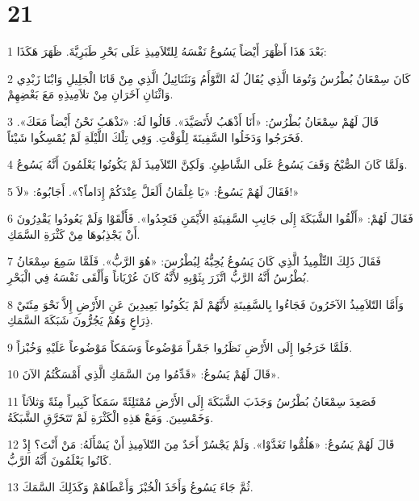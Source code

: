 \chapter{21}

\par 1 بَعْدَ هَذَا أَظْهَرَ أَيْضاً يَسُوعُ نَفْسَهُ لِلتّلاَمِيذِ عَلَى بَحْرِ طَبَرِيَّةَ. ظَهَرَ هَكَذَا:
\par 2 كَانَ سِمْعَانُ بُطْرُسُ وَتُومَا الَّذِي يُقَالُ لَهُ التَّوْأَمُ وَنَثَنَائِيلُ الَّذِي مِنْ قَانَا الْجَلِيلِ وَابْنَا زَبْدِي وَاثْنَانِ آخَرَانِ مِنْ تلاَمِيذِهِ مَعَ بَعْضِهِمْ.
\par 3 قَالَ لَهُمْ سِمْعَانُ بُطْرُسُ: «أَنَا أَذْهَبُ لأَتَصَيَّدَ». قَالُوا لَهُ: «نَذْهَبُ نَحْنُ أَيْضاً مَعَكَ». فَخَرَجُوا وَدَخَلُوا السَّفِينَةَ لِلْوَقْتِ. وَفِي تِلْكَ اللَّيْلَةِ لَمْ يُمْسِكُوا شَيْئاً.
\par 4 وَلَمَّا كَانَ الصُّبْحُ وَقَفَ يَسُوعُ عَلَى الشَّاطِئِ. وَلَكِنَّ التّلاَمِيذَ لَمْ يَكُونُوا يَعْلَمُونَ أَنَّهُ يَسُوعُ.
\par 5 فَقَالَ لَهُمْ يَسُوعُ: «يَا غِلْمَانُ أَلَعَلَّ عِنْدَكُمْ إِدَاماً؟». أَجَابُوهُ: «لاَ!»
\par 6 فَقَالَ لَهُمْ: «أَلْقُوا الشَّبَكَةَ إِلَى جَانِبِ السَّفِينَةِ الأَيْمَنِ فَتَجِدُوا». فَأَلْقَوْا وَلَمْ يَعُودُوا يَقْدِرُونَ أَنْ يَجْذِبُوهَا مِنْ كَثْرَةِ السَّمَكِ.
\par 7 فَقَالَ ذَلِكَ التِّلْمِيذُ الَّذِي كَانَ يَسُوعُ يُحِبُّهُ لِبُطْرُسَ: «هُوَ الرَّبُّ». فَلَمَّا سَمِعَ سِمْعَانُ بُطْرُسُ أَنَّهُ الرَّبُّ اتَّزَرَ بِثَوْبِهِ لأَنَّهُ كَانَ عُرْيَاناً وَأَلْقَى نَفْسَهُ فِي الْبَحْرِ.
\par 8 وَأَمَّا التّلاَمِيذُ الآخَرُونَ فَجَاءُوا بِالسَّفِينَةِ لأَنَّهُمْ لَمْ يَكُونُوا بَعِيدِينَ عَنِ الأَرْضِ إِلاَّ نَحْوَ مِئَتَيْ ذِرَاعٍ وَهُمْ يَجُرُّونَ شَبَكَةَ السَّمَكِ.
\par 9 فَلَمَّا خَرَجُوا إِلَى الأَرْضِ نَظَرُوا جَمْراً مَوْضُوعاً وَسَمَكاً مَوْضُوعاً عَلَيْهِ وَخُبْزاً.
\par 10 قَالَ لَهُمْ يَسُوعُ: «قَدِّمُوا مِنَ السَّمَكِ الَّذِي أَمْسَكْتُمُ الآنَ».
\par 11 فَصَعِدَ سِمْعَانُ بُطْرُسُ وَجَذَبَ الشَّبَكَةَ إِلَى الأَرْضِ مُمْتَلِئَةً سَمَكاً كَبِيراً مِئَةً وَثلاَثاً وَخَمْسِينَ. وَمَعْ هَذِهِ الْكَثْرَةِ لَمْ تَتَخَرَّقِ الشَّبَكَةُ.
\par 12 قَالَ لَهُمْ يَسُوعُ: «هَلُمُّوا تَغَدَّوْا». وَلَمْ يَجْسُرْ أَحَدٌ مِنَ التّلاَمِيذِ أَنْ يَسْأَلَهُ: مَنْ أَنْتَ؟ إِذْ كَانُوا يَعْلَمُونَ أَنَّهُ الرَّبُّ.
\par 13 ثُمَّ جَاءَ يَسُوعُ وَأَخَذَ الْخُبْزَ وَأَعْطَاهُمْ وَكَذَلِكَ السَّمَكَ.
